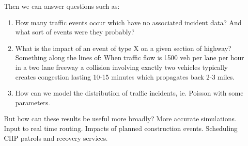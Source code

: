 \documentclass[12pt]{article}
\begin{document}
Then we can answer questions such as:
\begin{enumerate}
    \item How many traffic events occur which have no associated incident
        data? And what sort of events were they probably?
    \item What is the impact of an event of type X on a given section of
        highway? Something along the lines of: When traffic flow is 1500
        veh per lane per hour in a two lane freeway a collision involving
        exactly two vehicles typically creates congestion lasting 10-15
        minutes which propagates back 2-3 miles. 
    \item How can we model the distribution of traffic incidents, ie.
        Poisson with some parameters.
\end{enumerate}

But how can these results be useful more broadly? More accurate
simulations. Input to real time routing. Impacts of planned construction
events. Scheduling CHP patrols and recovery services.
\end{document}

